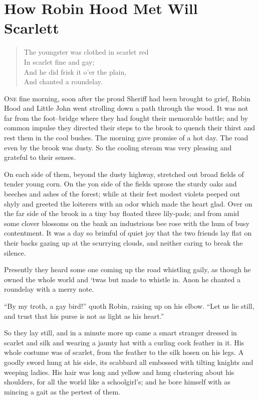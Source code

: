 \chapter{How Robin Hood Met Will Scarlett}

\begin{quote}
The youngster was clothed in scarlet red\\
In scarlet fine and gay;\\
And he did frisk it o’er the plain,\\
And chanted a roundelay.
\end{quote}

\lettrine{O}{ne} fine morning, soon after the proud Sheriff had been brought to
grief, Robin Hood and Little John went strolling down a path through the
wood. It was not far from the foot--bridge where they had fought their
memorable battle; and by common impulse they directed their steps to the
brook to quench their thirst and rest them in the cool bushes. The
morning gave promise of a hot day. The road even by the brook was dusty.
So the cooling stream was very pleasing and grateful to their senses.

On each side of them, beyond the dusty highway, stretched out broad
fields of tender young corn. On the yon side of the fields uprose the
sturdy oaks and beeches and ashes of the forest; while at their feet
modest violets peeped out shyly and greeted the loiterers with an odor
which made the heart glad. Over on the far side of the brook in a tiny
bay floated three lily-pads; and from amid some clover blossoms on the
bank an industrious bee rose with the hum of busy contentment. It was a
day so brimful of quiet joy that the two friends lay flat on their backs
gazing up at the scurrying clouds, and neither caring to break the
silence.

Presently they heard some one coming up the road whistling gaily, as
though he owned the whole world and `twas but made to whistle in. Anon
he chanted a roundelay with a merry note.

``By my troth, a gay bird!'' quoth Robin, raising up on his elbow. ``Let
us lie still, and trust that his purse is not as light as his heart.''

So they lay still, and in a minute more up came a smart stranger dressed
in scarlet and silk and wearing a jaunty hat with a curling cock feather
in it. His whole costume was of scarlet, from the feather to the silk
hosen on his legs. A goodly sword hung at his side, its scabbard all
embossed with tilting knights and weeping ladies. His hair was long and
yellow and hung clustering about his shoulders, for all the world like a
schoolgirl's; and he bore himself with as mincing a gait as the pertest
of them.

